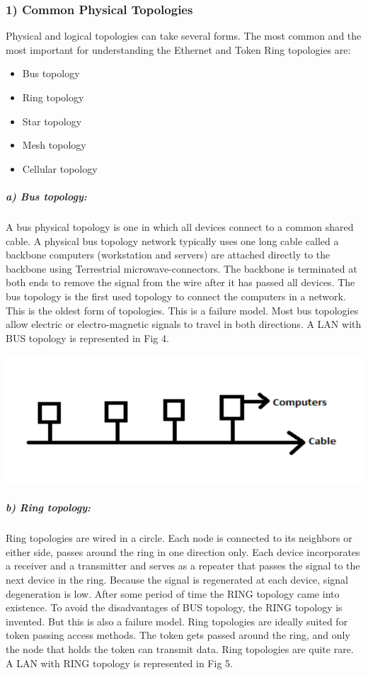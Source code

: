 \documentclass[12pt]{article}
\newenvironment{Figure}
  {\par\medskip\noindent\minipage{\linewidth}}
  {\endminipage\par\medskip}
\begin{document}
\begin{multicols*}{2}
\subsubsection*{1) Common Physical Topologies}
Physical and logical topologies can take several
forms. The most common and the most important for
understanding the Ethernet and Token Ring topologies
are:
\begin{itemize}
  \item Bus topology
  \item Ring topology
  \item Star topology
  \item Mesh topology
  \item Cellular topology
\end{itemize}

\subparagraph{a) Bus topology:}
\indent A bus physical topology is one in which all
devices connect to a common shared cable. A physical
bus topology network typically uses one long cable
called a backbone computers (workstation and servers)
are attached directly to the backbone using Terrestrial
microwave-connectors. The backbone is terminated at
both ends to remove the signal from the wire after it has
passed all devices. The bus topology is the first used
topology to connect the computers in a network. This is
the oldest form of topologies. This is a failure model.
Most bus topologies allow electric or electro-magnetic
signals to travel in both directions. A LAN with BUS
topology is represented in Fig 4.

\begin{Figure}
 \centering
 \includegraphics[width=\linewidth]{bus.png}
\end{Figure}

\subparagraph{b) Ring topology:}
\indent Ring topologies are wired in a circle. Each node
is connected to its neighbors or either side, passes
around the ring in one direction only. Each device
incorporates a receiver and a transmitter and serves as a
repeater that passes the signal to the next device in the
ring. Because the signal is regenerated at each device, signal degeneration is low. After some period of time
the RING topology came into existence. To avoid the
disadvantages of BUS topology, the RING topology is
invented. But this is also a failure model. Ring
topologies are ideally suited for token passing access
methods. The token gets passed around the ring, and
only the node that holds the token can transmit data.
Ring topologies are quite rare. A LAN with RING
topology is represented in Fig 5.


\end{multicols*}
\end{document}

